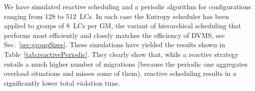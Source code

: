 
We have simulated reactive scheduling and a periodic algorithm for
configurations ranging from 128 to 512~LCs. In each case the Entropy
scheduler has been applied to groups of 8~LCs per GM, the variant of
hierarchical scheduling that performs most efficiently and closely
matches the efficiency of DVMS, see Sec.~\ref{sec:groupSizes}.
These simulations have yielded the results shown in
Table~\ref{tab:reactivePeriodic}. They clearly show that, while a
reactive strategy entails a much higher number of migrations (because
the periodic one aggregates overload situations and misses some of
them), reactive scheduling results in a significantly lower total
violation time.





